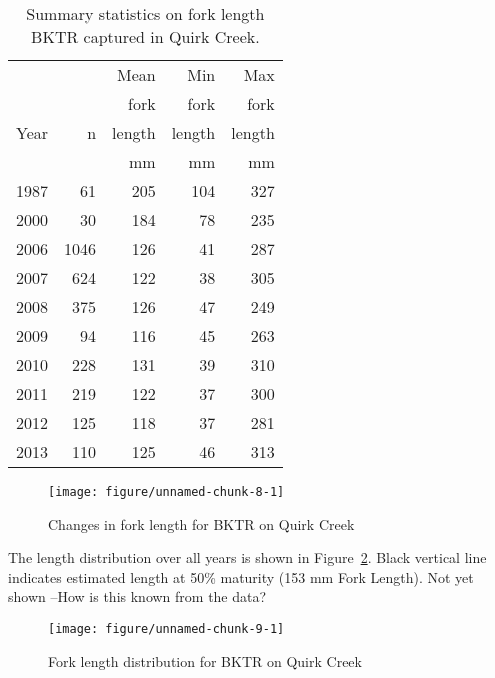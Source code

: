 \documentclass[]{article}\usepackage[]{graphicx}\usepackage[]{color}
\makeatletter
\def\maxwidth{ %
  \ifdim\Gin@nat@width>\linewidth
    \linewidth
  \else
    \Gin@nat@width
  \fi
}
\newenvironment{knitrout}{}{} %
\makeatother
\begin{document}
\begin{table}[h]
\centering
\captionsetup{width=.9\linewidth}
\caption{Summary statistics on fork length BKTR captured in Quirk Creek.}
\label{tab:fishsummaryBKTR}
\begin{tabular}{| l | r r r r | } \hline
           &           &  Mean   &  Min     & Max     \\
           &           &  fork   &  fork    & fork    \\
Year       &   n       &  length &  length  & length  \\
           &           & mm      &  mm      &  mm     \\ \hline
1987  &  61  &  205  &  104  &  327 \\ 
2000  &  30  &  184  &  78  &  235 \\ 
2006  &  1046  &  126  &  41  &  287 \\ 
2007  &  624  &  122  &  38  &  305 \\ 
2008  &  375  &  126  &  47  &  249 \\ 
2009  &  94  &  116  &  45  &  263 \\ 
2010  &  228  &  131  &  39  &  310 \\ 
2011  &  219  &  122  &  37  &  300 \\ 
2012  &  125  &  118  &  37  &  281 \\ 
2013  &  110  &  125  &  46  &  313 \\ 
\hline 

\end{tabular}
\end{table}

\begin{figure}[h]
\begin{center}
\begin{knitrout}
\color{fgcolor}
\texttt{[image: figure/unnamed-chunk-8-1]} 

\end{knitrout}
\end{center}
\caption{Changes in fork length for BKTR on Quirk Creek}
\label{fig:fishsummaryBKTR}
\end{figure}


\clearpage
The length distribution over all years is shown in Figure~\ref{fig:ldistBKTR}.
Black vertical line indicates estimated length at 50\% maturity (153 mm Fork Length).
{\Large Not yet shown --How is this known from the data? }


\begin{figure}[h]
\begin{center}
\begin{knitrout}
\color{fgcolor}
\texttt{[image: figure/unnamed-chunk-9-1]} 

\end{knitrout}
\end{center}
\caption{Fork length distribution for BKTR on Quirk Creek}
\label{fig:ldistBKTR}
\end{figure}
\end{document}
